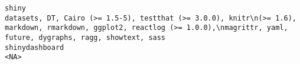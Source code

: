 \documentclass[
  letterpaper,
  DIV=11,
  numbers=noendperiod]{scrreprt}
\begin{document}
\begin{verbatim}
shiny                                                                                                                                                                                                                                                                                                                                                                                                                                                                                                                                                                                                                                                                                                                                                                                                                                                                                                                                                                                                                                                                                                                        datasets, DT, Cairo (>= 1.5-5), testthat (>= 3.0.0), knitr\n(>= 1.6), markdown, rmarkdown, ggplot2, reactlog (>= 1.0.0),\nmagrittr, yaml, future, dygraphs, ragg, showtext, sass
shinydashboard                                                                                                                                                                                                                                                                                                                                                                                                                                                                                                                                                                                                                                                                                                                                                                                                                                                                                                                                                                                                                                                                                                                                                                                                                                                                                           <NA>

\end{verbatim}
\end{document}
